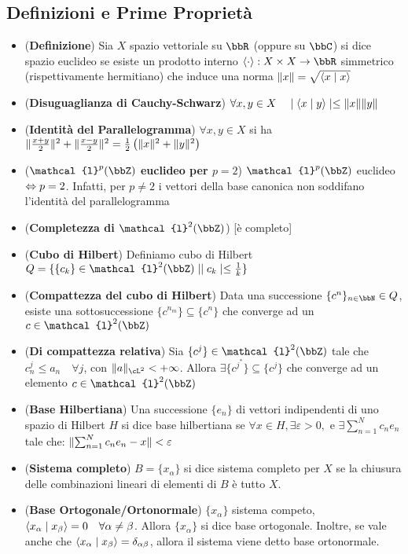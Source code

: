 \documentclass[a4paper,NoNotes,GeneralMath]{stdmdoc}
\newcommand{\cl}{\mathcal{l}}
\begin{document}
        \subsection*{Definizioni e Prime Proprietà}
        \begin{itemize}
        \item ({\bf Definizione}) Sia $X$ spazio vettoriale su $\bbR$ (oppure su $\bbC$) si dice spazio euclideo se esiste un prodotto interno $\langle \cdot \rangle : X \times X \rar \bbR$ simmetrico (rispettivamente hermitiano) che induce una norma $\| {x} \| = \sqrt{\langle x \mid x \rangle}$
        \item ({\bf Disuguaglianza di Cauchy-Schwarz}) $\forall x, y \in X \quad \mid \langle x \mid y \rangle \mid \le \| {x} \| \| {y} \|$
        \item ({\bf Identità del Parallelogramma}) $\forall x, y \in X$ si ha $\| {\frac{x+y}{2}} \|^2 + \| {\frac{x-y}{2}} \|^2 = \frac{1}{2} \left( \| {x} \|^2 + \| {y} \|^2 \right)$
        \item ({\bf $\cl^p(\bbZ)$ euclideo per $p = 2$}) $\cl^p(\bbZ)$ euclideo $\Leftrightarrow p = 2$. Infatti, per $p \neq 2$ i vettori della base canonica non soddifano l'identità del parallelogramma
        \item ({\bf Completezza di $\cl^2(\bbZ)$}) [è completo]
        \item ({\bf Cubo di Hilbert}) Definiamo cubo di Hilbert $Q = \{ \{c_k\} \in \cl^2(\bbZ) \mid \abs{c_k} \le \frac{1}{k} \}$
        \item ({\bf Compattezza del cubo di Hilbert}) Data una successione $\{ c^n \}_{n \in \bbN} \in Q$, esiste una sottosuccessione $\{ c^{n_m} \} \subseteq \{ c^n \}$ che converge ad un $c \in \cl^2(\bbZ)$
        \item ({\bf Di compattezza relativa}) Sia $\{ c^j \} \in \cl^2(\bbZ)$ tale che $c_n^j \le a_n \quad \forall j$, con $\norm{a}_{\cL^2} < +\infty$. Allora $\exists \{ c^{j^*} \} \subseteq \{ c^j \}$ che converge ad un elemento $c \in \cl^2(\bbZ)$
        \item ({\bf Base Hilbertiana}) Una successione $\{e_n\}$ di vettori indipendenti di uno spazio di Hilbert $H$ si dice base hilbertiana se $\forall x \in H, \exists \varepsilon > 0, \text{ e } \exists \sum_{n=1}^N c_n e_n$ tale che: $\| {\sum_{n=1}^N c_n e_n - x} \| < \varepsilon$
        \item ({\bf Sistema completo}) $B = \{ x_\alpha \}$ si dice sistema completo per $X$ se la chiusura delle combinazioni lineari di elementi di $B$ è tutto $X$.
        \item ({\bf Base Ortogonale/Ortonormale}) $\{x_\alpha\}$ sistema competo, $\langle x_\alpha \mid x_\beta \rangle = 0 \quad \forall \alpha \neq \beta$. Allora $\{x_\alpha\}$ si dice base ortogonale. Inoltre, se vale anche che $\langle x_\alpha \mid x_\beta \rangle = \delta_{\alpha\beta}$, allora il sistema viene detto base ortonormale.

\end{itemize}
\end{document}
